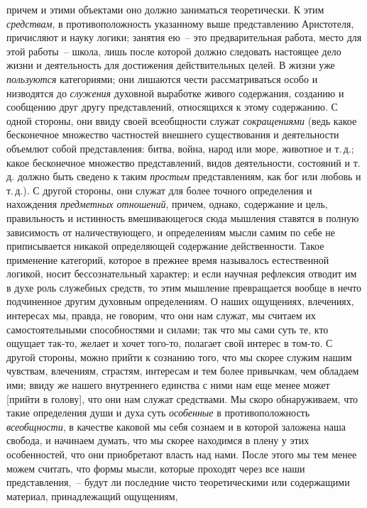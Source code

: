 причем и этими объектами оно должно заниматься теоретически.
К этим \emph{средствам}, в противоположность указанному
выше представлению Аристотеля, причисляют и науку
логики; занятия ею~-- это предварительная работа,
место для этой работы~-- школа, лишь после которой
должно следовать настоящее дело жизни и деятельность
для достижения действительных целей. В жизни уже
\emph{пользуются} категориями; они лишаются чести рассматриваться
особо и низводятся до \emph{служения} духовной выработке
живого содержания, созданию и сообщению друг
другу представлений, относящихся к этому содержанию.
С одной стороны, они ввиду своей всеобщности служат
\emph{сокращениями} (ведь какое бесконечное множество частностей
внешнего существования и деятельности объемлют
собой представления: битва, война, народ или море, животное
и т.\,д.; какое бесконечное множество представлений,
видов деятельности, состояний и т.\,д. должно быть
сведено к таким \emph{простым} представлениям, как бог или
любовь и т.\,д.). С другой стороны, они служат для более
точного определения и нахождения \emph{предметных отношений},
причем, однако, содержание и цель, правильность
и истинность вмешивающегося сюда мышления ставятся
в полную зависимость от наличествующего, и определениям
мысли самим по себе не приписывается никакой
определяющей содержание действенности. Такое применение
категорий, которое в прежнее время называлось
естественной логикой, носит бессознательный характер;
и если научная рефлексия отводит им в духе роль служебных
средств, то этим мышление превращается вообще
в нечто подчиненное другим духовным определениям.
О наших ощущениях, влечениях, интересах мы, правда,
не говорим, что они нам служат, мы считаем их самостоятельными
способностями и силами; так что мы сами
суть те, кто ощущает так-то, желает и хочет того-то,
полагает свой интерес в том-то. С другой стороны, можно
прийти к сознанию того, что мы скорее служим нашим
чувствам, влечениям, страстям, интересам и тем более
привычкам, чем обладаем ими; ввиду же нашего внутреннего
единства с ними нам еще менее может [прийти в голову],
что они нам служат средствами. Мы скоро обнаруживаем,
что такие определения души и духа суть \emph{особенные}
в противоположность \emph{всеобщности}, в качестве каковой
мы себя сознаем и в которой заложена наша свобода,
и начинаем думать, что мы скорее находимся в плену у
этих особенностей, что они приобретают власть над нами.
После этого мы тем менее можем считать, что формы
мысли, которые проходят через все наши представления,~--
будут ли последние чисто теоретическими или
содержащими материал, принадлежащий ощущениям,
